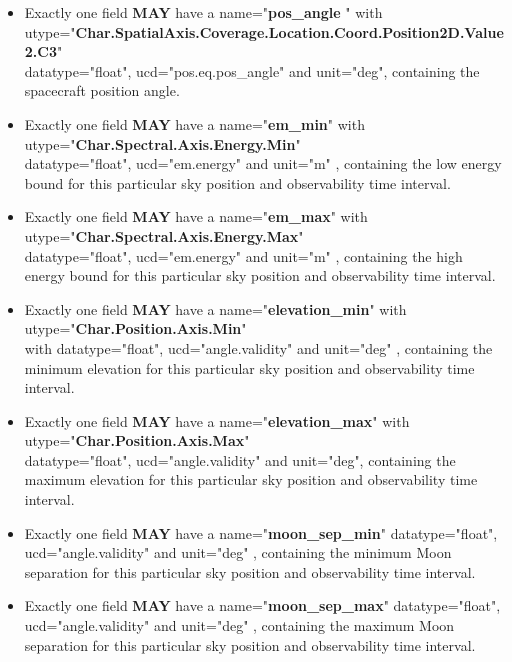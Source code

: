 \documentclass[11pt,a4paper]{ivoatex/ivoa}
\begin{document}
\begin{itemize}
\item {Exactly one field \textbf{MAY }have a name="\textbf{pos\_angle
}" with\\
utype="\textbf{Char.SpatialAxis.Coverage.Location.Coord.Position2D.Value2.C3}"\\
datatype="float", ucd="pos.eq.pos\_angle" and
unit="deg", containing the spacecraft position angle.}

\item {Exactly one field \textbf{MAY }have a name="\textbf{em\_min}" with\\
utype="\textbf{Char.Spectral.Axis.Energy.Min}"\\
datatype="float", ucd="em.energy" and unit="m" , containing the low energy bound for this particular sky position and observability time interval.}

\item {Exactly one field \textbf{MAY }have a name="\textbf{em\_max}" with\\
utype="\textbf{Char.Spectral.Axis.Energy.Max}"\\
datatype="float", ucd="em.energy" and unit="m" , containing the high energy bound for this particular sky position and
observability time interval.}

\item {Exactly one field \textbf{MAY }have a name="\textbf{elevation\_min}" with\\
utype="\textbf{Char.Position.Axis.Min}"\\ with
datatype="float", ucd="angle.validity" and unit="deg" , containing the minimum elevation for this particular sky position and observability
time interval.}

\item {Exactly one field \textbf{MAY }have a name="\textbf{elevation\_max}" with\\
utype="\textbf{Char.Position.Axis.Max}"\\
datatype="float", ucd="angle.validity" and unit="deg", containing the maximum elevation for this particular sky position and 
observability time interval.}

\item {Exactly one field \textbf{MAY }have a name="\textbf{moon\_sep\_min}" 
datatype="float", ucd="angle.validity" and
unit="deg" , containing the minimum Moon separation for this particular
sky position and observability time interval.}

\item {Exactly one field \textbf{MAY }have a name="\textbf{moon\_sep\_max}" 
datatype="float", ucd="angle.validity" and
unit="deg" , containing the maximum Moon separation for this particular
sky position and observability time interval.}


\end{itemize}
\end{document}
